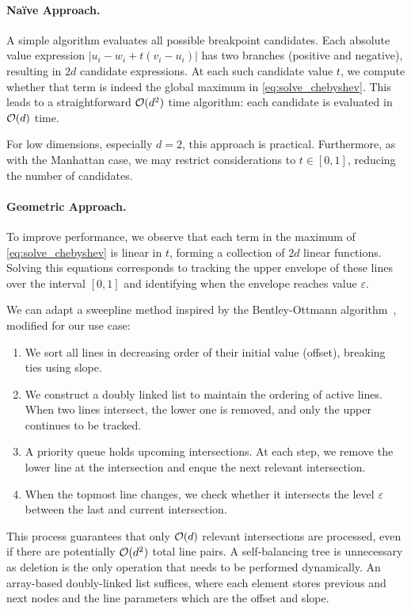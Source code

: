 \paragraph{Na\"ive Approach.}
A simple algorithm evaluates all possible breakpoint candidates. Each absolute value expression \(|u_i - w_i + t(v_i - u_i)|\) has two branches (positive and negative), resulting in \(2d\) candidate expressions. At each such candidate value \(t\), we compute whether that term is indeed the global maximum in \cref{eq:solve_chebyshev}. This leads to a straightforward \(\mathcal{O}(d^2)\) time algorithm: each candidate is evaluated in \(\mathcal{O}(d)\) time.

For low dimensions, especially \(d = 2\), this approach is practical. Furthermore, as with the Manhattan case, we may restrict considerations to \(t \in [0, 1]\), reducing the number of candidates.

\paragraph{Geometric Approach. }
To improve performance, we observe that each term in the maximum of \cref{eq:solve_chebyshev} is linear in \(t\), forming a collection of \(2d\) linear functions. Solving this equations corresponds to tracking the upper envelope of these lines over the interval \([0, 1]\) and identifying when the envelope reaches value \(\varepsilon\).

We can adapt a sweepline method inspired by the Bentley-Ottmann algorithm~\cite{computational_geometry}, modified for our use case: 
\begin{enumerate}
	\item We sort all lines in decreasing order of their initial value (offset), breaking ties using slope.
	\item We construct a doubly linked list to maintain the ordering of active lines. When two lines intersect, the lower one is removed, and only the upper continues to be tracked.
	\item A priority queue holds upcoming intersections. At each step, we remove the lower line at the intersection and enque the next relevant intersection. 
	\item When the topmost line changes, we check whether it intersects the level \(\varepsilon\) between the last and current intersection.
\end{enumerate}

This process guarantees that only \(\mathcal{O}(d)\) relevant intersections are processed, even if there are potentially \(\mathcal{O}(d^2)\) total line pairs. A self-balancing tree is unnecessary as deletion is the only operation that needs to be performed dynamically. An array-based doubly-linked list suffices, where each element stores previous and next nodes and the line parameters which are the offset and slope. 


